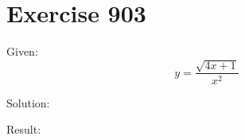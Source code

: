 \documentclass[a4paper, 10pt]{scrartcl}
\begin{document}
\section{Exercise 903}

Given:
\[
y = \frac{\sqrt{4x + 1}}{x^{2}}
\]

Solution:

Result:
\end{document}
